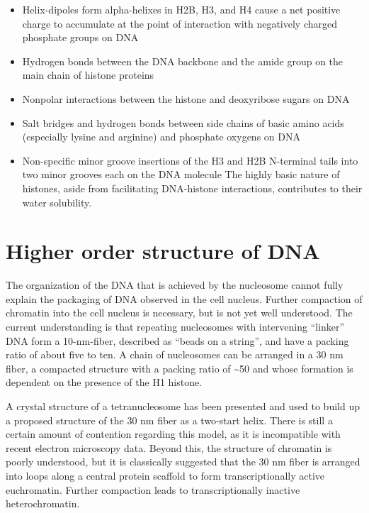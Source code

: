 \begin{itemize}
\tightlist
\item
  Helix-dipoles form alpha-helixes in H2B, H3, and H4 cause a net positive charge to accumulate at the point of interaction with negatively charged phosphate groups on DNA
\item
  Hydrogen bonds between the DNA backbone and the amide group on the main chain of histone proteins
\item
  Nonpolar interactions between the histone and deoxyribose sugars on DNA
\item
  Salt bridges and hydrogen bonds between side chains of basic amino acids (especially lysine and arginine) and phosphate oxygens on DNA
\item
  Non-specific minor groove insertions of the H3 and H2B N-terminal tails into two minor grooves each on the DNA molecule
  The highly basic nature of histones, aside from facilitating DNA-histone interactions, contributes to their water solubility.
\end{itemize}

\hypertarget{higher-order-structure-of-dna}{%
\section{Higher order structure of DNA}\label{higher-order-structure-of-dna}}

The organization of the DNA that is achieved by the nucleosome cannot fully explain the packaging of DNA observed in the cell nucleus. Further compaction of chromatin into the cell nucleus is necessary, but is not yet well understood. The current understanding is that repeating nucleosomes with intervening ``linker'' DNA form a 10-nm-fiber, described as ``beads on a string'', and have a packing ratio of about five to ten. A chain of nucleosomes can be arranged in a 30 nm fiber, a compacted structure with a packing ratio of \textasciitilde{}50 and whose formation is dependent on the presence of the H1 histone.

A crystal structure of a tetranucleosome has been presented and used to build up a proposed structure of the 30 nm fiber as a two-start helix. There is still a certain amount of contention regarding this model, as it is incompatible with recent electron microscopy data. Beyond this, the structure of chromatin is poorly understood, but it is classically suggested that the 30 nm fiber is arranged into loops along a central protein scaffold to form transcriptionally active euchromatin. Further compaction leads to transcriptionally inactive heterochromatin.


